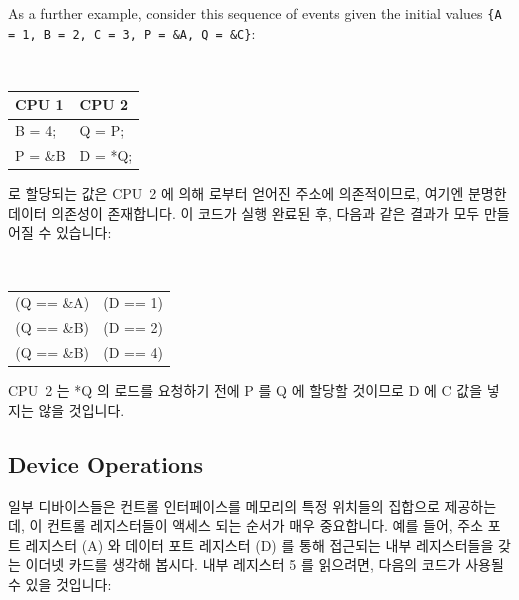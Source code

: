 As a further example, consider this sequence of events given the
initial values {\tt \{A = 1, B = 2, C = 3, P = \&A, Q = \&C\}}:
\fi

\vspace{5pt}
\begin{minipage}[t]{\columnwidth}
\tt
\scriptsize
\begin{tabular}{l|l}
	CPU 1 &		CPU 2 \\
	\hline
	B = 4; &	Q = P; \\
	P = \&B &	D = *Q; \\
\end{tabular}
\end{minipage}
\vspace{5pt}

 로 할당되는 값은 CPU~2 에 의해  로부터 얻어진 주소에 의존적이므로,
여기엔 분명한 데이터 의존성이 존재합니다.
이 코드가 실행 완료된 후, 다음과 같은 결과가 모두 만들어질 수 있습니다:

\vspace{5pt}
\begin{minipage}[t]{\columnwidth}
\tt
\scriptsize
\begin{tabular}{c@{ and }c}
	(Q == \&A) & (D == 1) \\
	(Q == \&B) & (D == 2) \\
	(Q == \&B) & (D == 4) \\
\end{tabular}
\end{minipage}
\vspace{5pt}

CPU~2 는 *Q 의 로드를 요청하기 전에 P 를 Q 에 할당할 것이므로 D 에 C 값을
넣지는 않을 것입니다.

\subsection{Device Operations}
\label{sec:advsync:Device Operations}

일부 디바이스들은 컨트롤 인터페이스를 메모리의 특정 위치들의 집합으로
제공하는데, 이 컨트롤 레지스터들이 액세스 되는 순서가 매우 중요합니다.
예를 들어, 주소 포트 레지스터 (A) 와 데이터 포트 레지스터 (D) 를 통해 접근되는
내부 레지스터들을 갖는 이더넷 카드를 생각해 봅시다.
내부 레지스터 5 를 읽으려면, 다음의 코드가 사용될 수 있을 것입니다:
\iffalse

